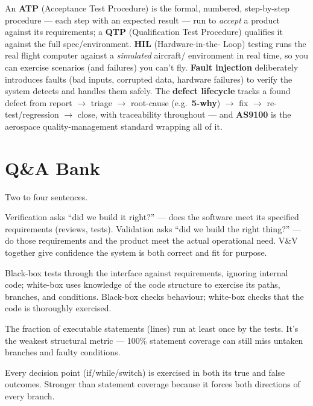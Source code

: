 An \textbf{ATP} (Acceptance Test Procedure) is the formal, numbered, step-by-step
procedure --- each step with an expected result --- run to \emph{accept} a
product against its requirements; a \textbf{QTP} (Qualification Test Procedure)
qualifies it against the full spec/environment. \textbf{HIL} (Hardware-in-the-
Loop) testing runs the real flight computer against a \emph{simulated} aircraft/
environment in real time, so you can exercise scenarios (and failures) you can't
fly. \textbf{Fault injection} deliberately introduces faults (bad inputs,
corrupted data, hardware failures) to verify the system detects and handles them
safely. The \textbf{defect lifecycle} tracks a found defect from report
$\rightarrow$ triage $\rightarrow$ root-cause (e.g.\ \textbf{5-why}) $\rightarrow$
fix $\rightarrow$ re-test/regression $\rightarrow$ close, with traceability
throughout --- and \textbf{AS9100} is the aerospace quality-management standard
wrapping all of it.

\section{Q\&A Bank}

%
{Two to four sentences.}

Verification asks ``did we build it right?'' --- does the software meet its
specified requirements (reviews, tests). Validation asks ``did we build the right
thing?'' --- do those requirements and the product meet the actual operational
need. V\&V together give confidence the system is both correct and fit for
purpose.

Black-box tests through the interface against requirements, ignoring internal
code; white-box uses knowledge of the code structure to exercise its paths,
branches, and conditions. Black-box checks behaviour; white-box checks that the
code is thoroughly exercised.

The fraction of executable statements (lines) run at least once by the tests.
It's the weakest structural metric --- 100\% statement coverage can still miss
untaken branches and faulty conditions.

Every decision point (if/while/switch) is exercised in both its true and false
outcomes. Stronger than statement coverage because it forces both directions of
every branch.

